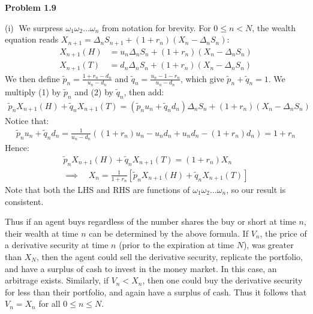 \documentclass[12pt, letterpaper]{article}
\begin{document}
\rightline{$\square$}

\vspace{5mm}
\noindent
\textbf{Problem 1.9} 

\vspace{5mm}
\noindent
(i)$\;$ 
We surpress $\omega_1 \omega_2 \dots \omega_n$ from notation for brevity.
For $0\leq n < N$, the wealth equation reads $X_{n+1} = \Delta_n S_{n+1} + (1+r_n)(X_n - \Delta_n S_n)$:
\begin{align*}
    X_{n+1}(H) &= u_n \Delta_n S_n + (1+r_n)(X_n - \Delta_n S_n) \tag{1}\\
    X_{n+1}(T) &= d_n \Delta_n S_n + (1+r_n)(X_n - \Delta_n S_n) \tag{2}
\end{align*}
We then define $\tilde p_n = \frac{1+r_n-d_n}{u_n-d_n}$ and $\tilde q_n = \frac{u_n-1-r_n}{u_n-d_n}$, which give $\tilde p_n + \tilde q_n = 1$. We multiply (1) by $\tilde p_n$ and (2) by $\tilde q_n$, then add:
\begin{gather*}
    \tilde p_n X_{n+1}(H)+ \tilde q_n X_{n+1}(T) = (\tilde p_n u_n + \tilde q_n d_n) \Delta_n S_n + (1+r_n)(X_n - \Delta_n S_n)
\end{gather*}
Notice that:
\begin{gather*}
    \tilde p_n u_n + \tilde q_n d_n = \frac{1}{u_n-d_n} \left( (1+ r_n )u_n - u_n d_n + u_n d_n - (1 + r_n)d_n \right) = 1 + r_n
\end{gather*}
Hence:
\begin{gather*}
    \tilde p_n X_{n+1}(H)+ \tilde q_n X_{n+1}(T) = (1+r_n)X_n \\
    \implies \quad X_n = \frac{1}{1+r_n} \left[ \tilde p_n X_{n+1}(H)+ \tilde q_n X_{n+1}(T)\right]
\end{gather*}
Note that both the LHS and RHS are functions of $\omega_1 \omega_2 \dots \omega_n$, so our result is consistent.

\vspace{5mm}

Thus if an agent buys regardless of the number shares the buy or short at time $n$, their wealth at time $n$ can be determined by the above formula.
If $V_n$, the price of a derivative security at time $n$ (prior to the expiration at time $N$), was greater than $X_N$,
then the agent could sell the derivative security, replicate the portfolio, and have a surplus of cash to invest in the money market.
In this case, an arbitrage exists.
Similarly, if $V_n < X_n$, then one could buy the derivative security for less than their portfolio, and again have a surplus of cash.
Thus it follows that $V_n = X_n$ for all $0 \leq n \leq N$.
\end{document}
